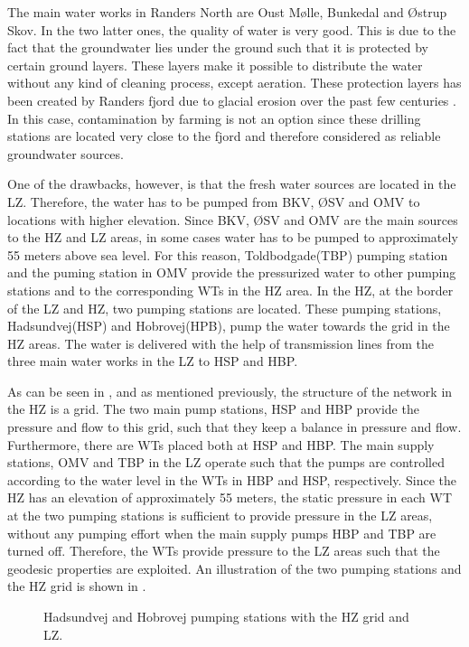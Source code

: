 The main water works in Randers North are Oust Mølle, Bunkedal and Østrup Skov. In the two latter ones, the quality of water is very good. This is due to the fact that the groundwater lies under the ground such that it is protected by certain ground layers. These layers make it possible to distribute the water without any kind of cleaning process, except aeration. These protection layers has been created by Randers fjord due to glacial erosion over the past few centuries \cite{geological1909water}. In this case, contamination by farming is not an option since these drilling stations are located very close to the fjord and therefore considered as reliable groundwater sources. 

One of the drawbacks, however, is that the fresh water sources are located in the LZ. Therefore, the water has to be pumped from BKV, ØSV and OMV to locations with higher elevation. Since BKV, ØSV and OMV are the main sources to the HZ and LZ areas, in some cases water has to be pumped to approximately 55 meters above sea level. For this reason, Toldbodgade(TBP) pumping station and the puming station in OMV provide the pressurized water to other pumping stations and to the corresponding WTs in the HZ area. In the HZ, at the border of the LZ and HZ, two pumping stations are located. These pumping stations, Hadsundvej(HSP) and Hobrovej(HPB), pump the water towards the grid in the HZ areas. The water is delivered with the help of transmission lines from the three main water works in the LZ to HSP and HBP. 

As can be seen in , and as mentioned previously, the structure of the network in the HZ is a grid. The two main pump stations, HSP and HBP provide the pressure and flow to this grid, such that they keep a balance in pressure and flow. Furthermore, there are WTs placed both at HSP and HBP. The main supply stations, OMV and TBP in the LZ operate such that the pumps are controlled according to the water level in the WTs in HBP and HSP, respectively. Since the HZ has an elevation of approximately 55 meters, the static pressure in each WT at the two pumping stations is sufficient to provide pressure in the LZ areas, without any pumping effort when the main supply pumps HBP and TBP are turned off. Therefore, the WTs provide pressure to the LZ areas such that the geodesic properties are exploited. An illustration of the two pumping stations and the HZ grid is shown in . 

\begin{figure}[H]
\centering

\caption{Hadsundvej and Hobrovej pumping stations with the HZ grid and LZ.}
\label{fig:HBP_HSP_grid}
\end{figure}

